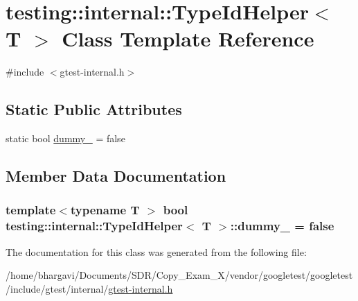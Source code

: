 \hypertarget{classtesting_1_1internal_1_1_type_id_helper}{}\section{testing\+:\+:internal\+:\+:Type\+Id\+Helper$<$ T $>$ Class Template Reference}
\label{classtesting_1_1internal_1_1_type_id_helper}


{\ttfamily \#include $<$gtest-\/internal.\+h$>$}

\subsection*{Static Public Attributes}
\begin{DoxyCompactItemize}
\item 
static bool \hyperlink{classtesting_1_1internal_1_1_type_id_helper_a372268b1520d965d0bdf01ebad3d270e}{dummy\+\_\+} = false
\end{DoxyCompactItemize}


\subsection{Member Data Documentation}
\subsubsection[{\texorpdfstring{dummy\+\_\+}{dummy_}}]{\setlength{\rightskip}{0pt plus 5cm}template$<$typename T $>$ bool {\bf testing\+::internal\+::\+Type\+Id\+Helper}$<$ T $>$\+::dummy\+\_\+ = false\hspace{0.3cm}{\ttfamily [static]}}\hypertarget{classtesting_1_1internal_1_1_type_id_helper_a372268b1520d965d0bdf01ebad3d270e}{}\label{classtesting_1_1internal_1_1_type_id_helper_a372268b1520d965d0bdf01ebad3d270e}


The documentation for this class was generated from the following file\+:\begin{DoxyCompactItemize}
\item 
/home/bhargavi/\+Documents/\+S\+D\+R/\+Copy\+\_\+\+Exam\+\_\+X/vendor/googletest/googletest/include/gtest/internal/\hyperlink{gtest-internal_8h}{gtest-\/internal.\+h}\end{DoxyCompactItemize}
